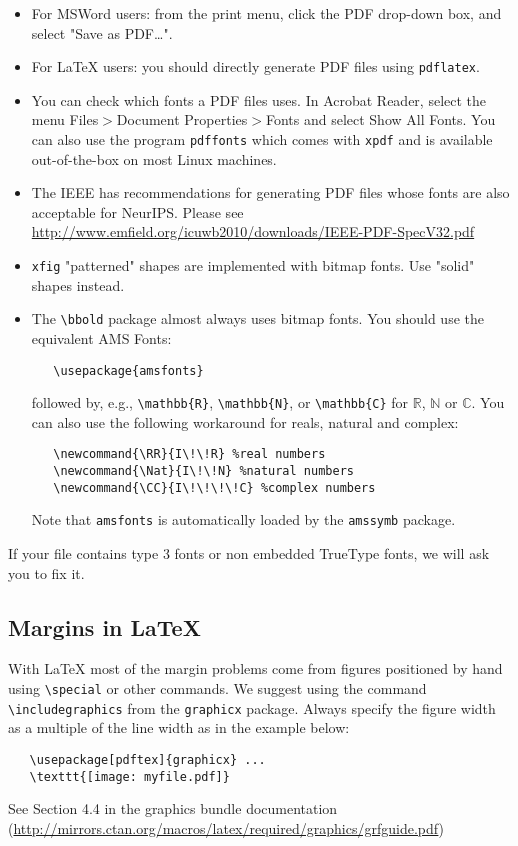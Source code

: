 \documentclass{article}
\begin{document}
\begin{itemize}

\item For MSWord users: from the print menu, click the PDF drop-down box, and select "Save as PDF…".

\item For \LaTeX{} users: you should directly generate PDF files using \verb+pdflatex+.

\item You can check which fonts a PDF files uses.  In Acrobat Reader, select the
  menu Files$>$Document Properties$>$Fonts and select Show All Fonts. You can
  also use the program \verb+pdffonts+ which comes with \verb+xpdf+ and is
  available out-of-the-box on most Linux machines.

\item The IEEE has recommendations for generating PDF files whose fonts are also
  acceptable for NeurIPS. Please see
  \url{http://www.emfield.org/icuwb2010/downloads/IEEE-PDF-SpecV32.pdf}

\item \verb+xfig+ "patterned" shapes are implemented with bitmap fonts.  Use
  "solid" shapes instead.

\item The \verb+\bbold+ package almost always uses bitmap fonts.  You should use
  the equivalent AMS Fonts:
\begin{verbatim}
   \usepackage{amsfonts}
\end{verbatim}
followed by, e.g., \verb+\mathbb{R}+, \verb+\mathbb{N}+, or \verb+\mathbb{C}+
for $\mathbb{R}$, $\mathbb{N}$ or $\mathbb{C}$.  You can also use the following
workaround for reals, natural and complex:
\begin{verbatim}
   \newcommand{\RR}{I\!\!R} %real numbers
   \newcommand{\Nat}{I\!\!N} %natural numbers
   \newcommand{\CC}{I\!\!\!\!C} %complex numbers
\end{verbatim}
Note that \verb+amsfonts+ is automatically loaded by the \verb+amssymb+ package.

\end{itemize}

If your file contains type 3 fonts or non embedded TrueType fonts, we will ask
you to fix it.

\subsection{Margins in \LaTeX{}}

With \LaTeX{} most of the margin problems come from figures positioned by hand using
\verb+\special+ or other commands. We suggest using the command
\verb+\includegraphics+ from the \verb+graphicx+ package. Always specify the
figure width as a multiple of the line width as in the example below:
\begin{verbatim}
   \usepackage[pdftex]{graphicx} ...
   \texttt{[image: myfile.pdf]}
\end{verbatim}
See Section 4.4 in the graphics bundle documentation
(\url{http://mirrors.ctan.org/macros/latex/required/graphics/grfguide.pdf})
\end{document}
